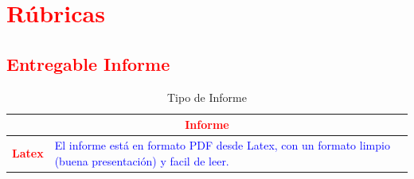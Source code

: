 \documentclass{article}
\begin{document}
    \clearpage

	\section{\textcolor{red}{Rúbricas}}
	
	\subsection{\textcolor{red}{Entregable Informe}}
	\begin{table}[H]
		\caption{Tipo de Informe}
		\setlength{\tabcolsep}{0.5em} %
		{\renewcommand{\arraystretch}{1.5}%
		\begin{tabular}{|p{3cm}|p{12cm}|}
			\hline
			\multicolumn{2}{|c|}{\textbf{\textcolor{red}{Informe}}}  \\
			\hline 
			\textbf{\textcolor{red}{Latex}} & \textcolor{blue}{El informe está en formato PDF desde Latex,  con un formato limpio (buena presentación) y facil de leer.}   \\ 
			\hline 
			
			
		\end{tabular}
	}
	\end{table}
	

	
\end{document}
